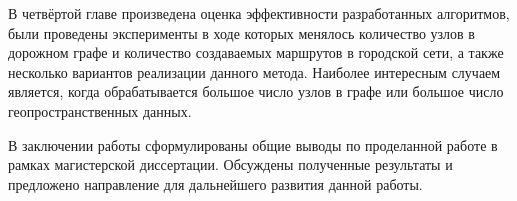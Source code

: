 В четвёртой главе произведена оценка эффективности разработанных алгоритмов, были проведены эксперименты в ходе которых 
менялось количество узлов в дорожном графе и количество создаваемых маршрутов в городской сети, а также несколько 
вариантов реализации данного метода. Наиболее интересным случаем является, когда обрабатывается большое число узлов в 
графе или большое число геопространственных данных.

В заключении работы сформулированы общие выводы по проделанной работе в рамках магистерской диссертации. Обсуждены 
полученные результаты и предложено направление для дальнейшего развития данной работы.